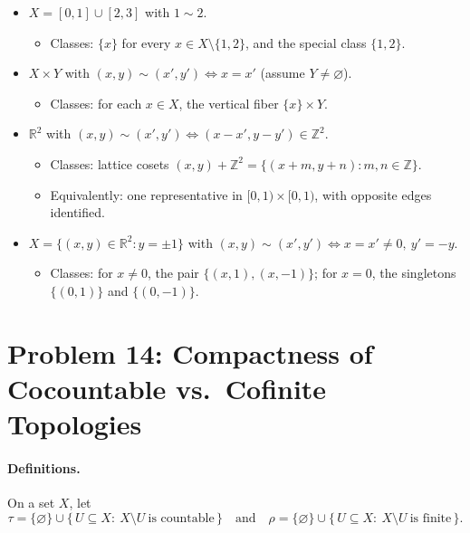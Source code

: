 \documentclass[12pt,a4paper]{article}
\theoremstyle{plain}
\theoremstyle{definition}
\theoremstyle{remark}
\theoremstyle{remark}
\begin{document}
	\begin{itemize}
		\item[\textbf{(10)}] $X=[0,1]\cup[2,3]$ with $1\sim2$.
		\begin{itemize}
			\item Classes: $\{x\}$ for every $x\in X\setminus\{1,2\}$, and the special class $\{1,2\}$.
		\end{itemize}
		
		\item[\textbf{(11b)}] $X\times Y$ with $(x,y)\sim(x',y')\iff x=x'$ (assume $Y\neq\varnothing$).
		\begin{itemize}
			\item Classes: for each $x\in X$, the vertical fiber $\{x\}\times Y$.
		\end{itemize}
		
		\item[\textbf{(12)}] $\mathbb{R}^2$ with $(x,y)\sim(x',y')\iff (x-x',y-y')\in\mathbb{Z}^2$.
		\begin{itemize}
			\item Classes: lattice cosets $(x,y)+\mathbb{Z}^2=\{(x+m,y+n):m,n\in\mathbb{Z}\}$.
			\item Equivalently: one representative in $[0,1)\times[0,1)$, with opposite edges identified.
		\end{itemize}
		
		\item[\textbf{(13)}] $X=\{(x,y)\in\mathbb{R}^2:y=\pm1\}$ with $(x,y)\sim(x',y')\iff x=x'\neq0,\ y'=-y$.
		\begin{itemize}
			\item Classes: for $x\neq0$, the pair $\{(x,1),(x,-1)\}$; for $x=0$, the singletons $\{(0,1)\}$ and $\{(0,-1)\}$.
		\end{itemize}
	\end{itemize}
	
	\section*{Problem 14: Compactness of Cocountable vs.\ Cofinite Topologies}
	
	\paragraph{Definitions.}
	On a set $X$, let
	\[
	\tau=\{\varnothing\}\cup\{\,U\subseteq X:\ X\setminus U\ \text{is countable}\,\}
	\quad\text{and}\quad
	\rho=\{\varnothing\}\cup\{\,U\subseteq X:\ X\setminus U\ \text{is finite}\,\}.
	\]
	
\end{document}
